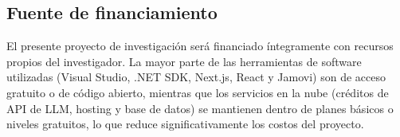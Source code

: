 \subsection{Fuente de financiamiento}

El presente proyecto de investigación será financiado íntegramente
con recursos propios del investigador. La mayor parte de las
herramientas de software utilizadas (Visual Studio, .NET SDK, Next.js,
React y Jamovi) son de acceso gratuito o de código abierto, mientras
que los servicios en la nube (créditos de API de LLM, hosting y base
de datos) se mantienen dentro de planes básicos o niveles gratuitos,
lo que reduce significativamente los costos del proyecto.